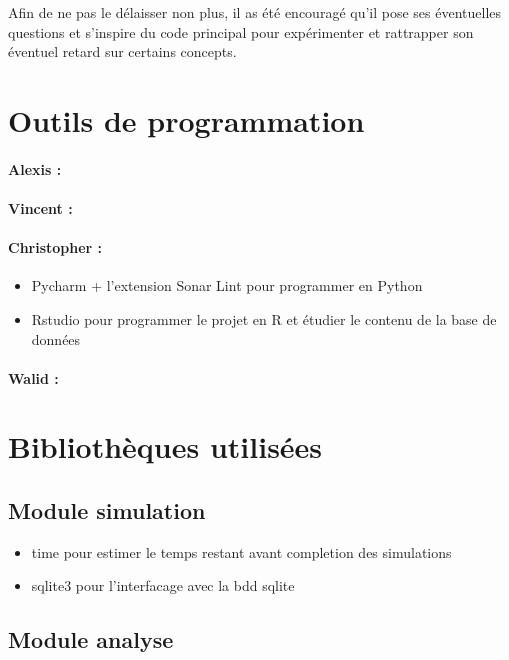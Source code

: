 \documentclass[
	headsepline=on,
	footsepline=on,
	twoside=off,
	abstract=on,
	DIV=10
]{scrreprt}
\begin{document}
		Afin de ne pas le délaisser non plus, il as été encouragé qu'il pose ses éventuelles questions et s'inspire du code principal pour expérimenter et rattrapper son éventuel retard sur certains concepts.
		
		
			\section{Outils de programmation}
				\paragraph{Alexis :}
				\paragraph{Vincent :}
			
				\paragraph{Christopher :}
				\begin{itemize}
					\item Pycharm + l'extension Sonar Lint pour programmer en Python
					\item Rstudio pour programmer le projet en R et étudier le contenu de la base de données
				\end{itemize}
				\paragraph{Walid :}
			
			\section{Bibliothèques utilisées}
				\subsection{Module simulation}
				
				\begin{itemize}
					\item time pour estimer le temps restant avant completion des simulations
					\item sqlite3 pour l'interfacage avec la bdd sqlite
				\end{itemize}
			
				\subsection{Module analyse}
				
\end{document}
